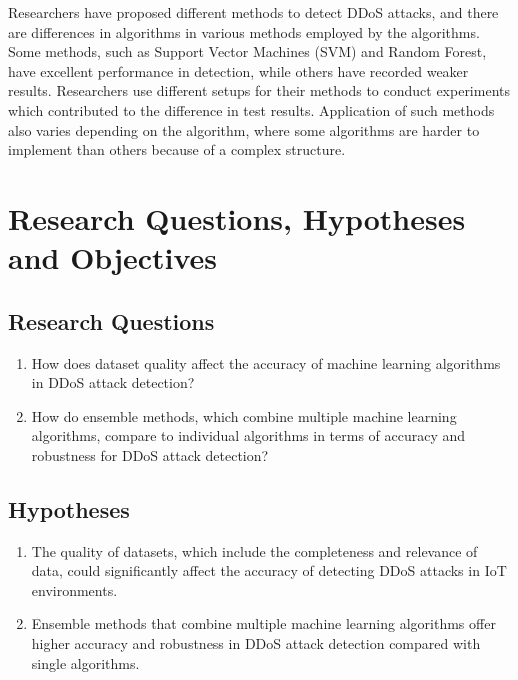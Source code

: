\documentclass[a4paper, 12pt]{article}
\begin{document}
Researchers have proposed different methods to detect DDoS attacks, and there are differences in algorithms in various methods employed by the algorithms. Some methods, such as Support Vector Machines (SVM) and Random Forest, have excellent performance in detection, while others have recorded weaker results. Researchers use different setups for their methods to conduct experiments which contributed to the difference in test results.  Application of such methods also varies depending on the algorithm, where some algorithms are harder to implement than others because of a complex structure. \cite{9} 

\clearpage

\section{Research Questions, Hypotheses and Objectives}

\subsection{Research Questions}
\begin{enumerate}
  \item How does dataset quality affect the accuracy of machine learning algorithms in DDoS attack detection?
  \item How do ensemble methods, which combine multiple machine learning algorithms, compare to individual algorithms in terms of accuracy and robustness for DDoS attack detection?
\end{enumerate}

\subsection{Hypotheses}
\begin{enumerate}
  \item The quality of datasets, which include the completeness and relevance of data, could significantly affect the accuracy of detecting DDoS attacks in IoT environments.
  \item Ensemble methods that combine multiple machine learning algorithms offer higher accuracy and robustness in DDoS attack detection compared with single algorithms.
\end{enumerate}
\end{document}
